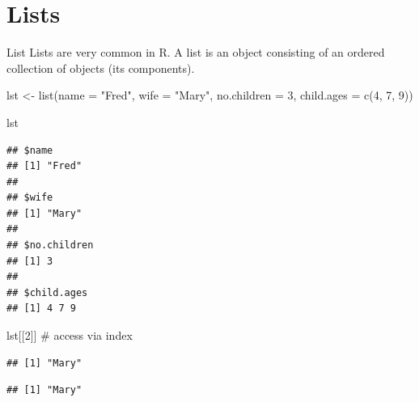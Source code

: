 \documentclass[
  9pt,
  ignorenonframetext,
]{beamer}
\newenvironment{Shaded}{\begin{snugshade}}{\end{snugshade}}
\newcommand{\CommentTok}[1]{\textcolor[rgb]{0.50,0.62,0.50}{#1}}
\newcommand{\DataTypeTok}[1]{\textcolor[rgb]{0.87,0.87,0.75}{#1}}
\newcommand{\DecValTok}[1]{\textcolor[rgb]{0.86,0.86,0.80}{#1}}
\newcommand{\KeywordTok}[1]{\textcolor[rgb]{0.94,0.87,0.69}{#1}}
\newcommand{\NormalTok}[1]{\textcolor[rgb]{0.80,0.80,0.80}{#1}}
\newcommand{\OperatorTok}[1]{\textcolor[rgb]{0.94,0.94,0.82}{#1}}
\newcommand{\StringTok}[1]{\textcolor[rgb]{0.80,0.58,0.58}{#1}}
\begin{document}
\hypertarget{lists}{%
\section{Lists}\label{lists}}

\begin{frame}[fragile]{List}
\protect\hypertarget{list}{}
Lists are very common in R. A list is an object consisting of an ordered
collection of objects (its components).

\tiny
\vfill

\begin{Shaded}
\begin{Highlighting}[]
\NormalTok{lst \textless{}{-}}\StringTok{ }\KeywordTok{list}\NormalTok{(}\DataTypeTok{name =} \StringTok{"Fred"}\NormalTok{, }\DataTypeTok{wife =} \StringTok{"Mary"}\NormalTok{, }\DataTypeTok{no.children =} \DecValTok{3}\NormalTok{,}
                   \DataTypeTok{child.ages =} \KeywordTok{c}\NormalTok{(}\DecValTok{4}\NormalTok{, }\DecValTok{7}\NormalTok{, }\DecValTok{9}\NormalTok{))}

\NormalTok{lst}
\end{Highlighting}
\end{Shaded}

\begin{verbatim}
## $name
## [1] "Fred"
## 
## $wife
## [1] "Mary"
## 
## $no.children
## [1] 3
## 
## $child.ages
## [1] 4 7 9
\end{verbatim}

\begin{Shaded}
\begin{Highlighting}[]
\NormalTok{lst[[}\DecValTok{2}\NormalTok{]]        }\CommentTok{\# access via index}
\end{Highlighting}
\end{Shaded}

\begin{verbatim}
## [1] "Mary"
\end{verbatim}

\begin{Shaded}
\end{Shaded}

\begin{verbatim}
## [1] "Mary"
\end{verbatim}


\end{frame}
\end{document}
